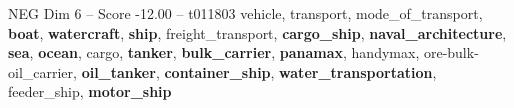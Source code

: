 \begin{textsample}{NEG Dim 6 – Score -12.00 – t011803}  \label{ex:f6_neg_007}
vehicle, transport, mode\_of\_transport, \textbf{boat}, \textbf{watercraft}, \textbf{ship}, freight\_transport, \textbf{cargo\_ship}, \textbf{naval\_architecture}, \textbf{sea}, \textbf{ocean}, cargo, \textbf{tanker}, \textbf{bulk\_carrier}, \textbf{panamax}, handymax, ore-bulk-oil\_carrier, \textbf{oil\_tanker}, \textbf{container\_ship}, \textbf{water\_transportation}, feeder\_ship, \textbf{motor\_ship}

\end{textsample}
